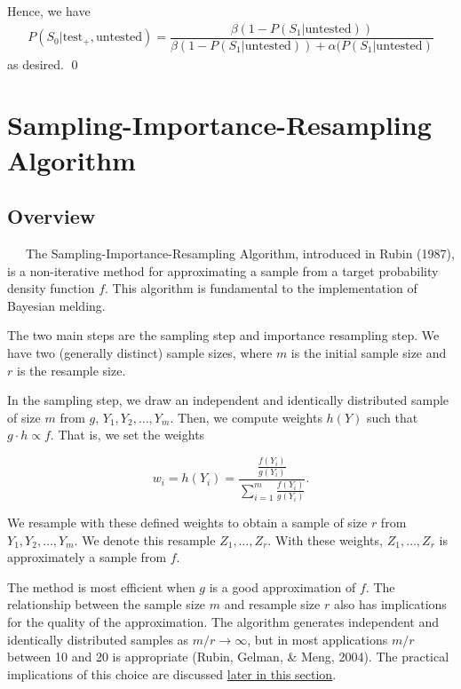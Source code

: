 \documentclass[12pt,twoside]{smiththesis}
\begin{document}
\noindent Hence, we have
\begin{align*}
P(S_0 |\text{test}_+, \text{untested}) = \dfrac{\beta (1- P(S_1|\text{untested}))}{\beta(1- P(S_1|\text{untested})) + \alpha(P(S_1|\text{untested})}
\end{align*}
\noindent as desired.
\qed

\newpage

\hypertarget{sampling}{%
\section{Sampling-Importance-Resampling Algorithm}\label{sampling}}

\hypertarget{overview}{%
\subsection{Overview}\label{overview}}

~~~The Sampling-Importance-Resampling Algorithm, introduced in Rubin (1987), is a non-iterative method for approximating a sample from a target probability density function \(f\). This algorithm is fundamental to the implementation of Bayesian melding.

The two main steps are the sampling step and importance resampling step. We have two (generally distinct) sample sizes, where \(m\) is the initial sample size and \(r\) is the resample size.

In the sampling step, we draw an independent and identically distributed sample of size \(m\) from \(g\), \(Y_1, Y_2, \dots, Y_m\). Then, we compute weights \(h(Y)\) such that \(g \cdot h \propto f\). That is, we set the weights

\[w_i = h(Y_i) = \dfrac{\frac{f(Y_i) } {g(Y_i)} }{\sum_{i=1}^m\frac{f(Y_i) } {g(Y_i)} }.\]

We resample with these defined weights to obtain a sample of size \(r\) from \(Y_1, Y_2, \dots, Y_m\). We denote this resample \(Z_1,\dots, Z_r\). With these weights, \(Z_1,\dots, Z_r\) is approximately a sample from \(f\).

The method is most efficient when \(g\) is a good approximation of \(f\). The relationship between the sample size \(m\) and resample size \(r\) also has implications for the quality of the approximation. The algorithm generates independent and identically distributed samples as \(m/r \to \infty\), but in most applications \(m/r\) between 10 and 20 is appropriate (Rubin, Gelman, \& Meng, 2004). The practical implications of this choice are discussed \protect\hyperlink{presamp}{later in this section}.
\end{document}
